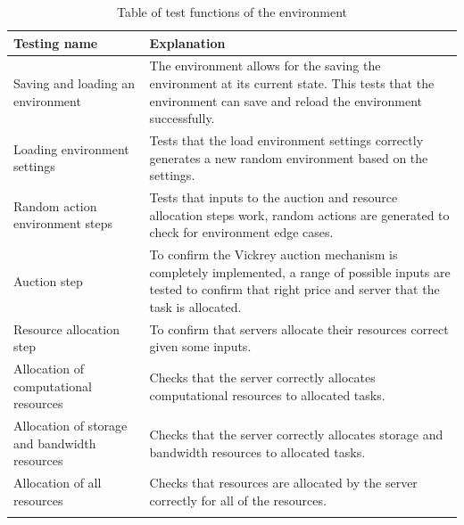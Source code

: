 \begin{longtable}{|p{3cm}|p{11cm}|} \hline
    \textbf{Testing name} & \textbf{Explanation} \\ \hline
    Saving and loading an environment & The environment allows for the saving the environment at its current
        state. This tests that the environment can save and reload the environment successfully. \\ \hline
    Loading environment settings & Tests that the load environment settings correctly generates a new random
        environment based on the settings. \\ \hline
    Random action environment steps & Tests that inputs to the auction and resource allocation steps work,
        random actions are generated to check for environment edge cases.  \\ \hline
    Auction step & To confirm the Vickrey auction mechanism is completely implemented, a range of possible inputs
        are tested to confirm that right price and server that the task is allocated. \\ \hline
    Resource allocation step & To confirm that servers allocate their resources correct given some inputs. \\ \hline
    Allocation of computational resources & Checks that the server correctly allocates computational resources to
        allocated tasks. \\ \hline
    Allocation of storage and bandwidth resources & Checks that the server correctly allocates storage and
        bandwidth resources to allocated tasks. \\ \hline
    Allocation of all resources & Checks that resources are allocated by the server correctly for all of the
        resources. \\ \hline
    \caption{Table of test functions of the environment}
    \label{tab:env_testing}
\end{longtable}


